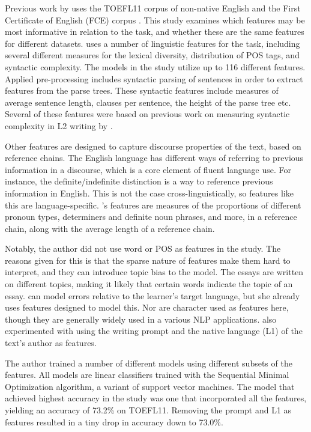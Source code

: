 Previous work by \textcite{vajjala17} uses the TOEFL11 corpus of non-native
English \autocite{blanchard13} and the First Certificate of English (FCE)
corpus \autocite{yannakoudakis2011new}. This study examines which features
may be most informative in relation to the task, and whether these are the
same features for different datasets. \citeauthor{vajjala17} uses a number of
linguistic features for the task, including several different measures for
the lexical diversity, distribution of \ac{POS} tags, and syntactic
complexity. The models in the study utilize up to 116 different features.
Applied pre-processing includes syntactic parsing of sentences in order to
extract features from the parse trees. These syntactic features include
measures of average sentence length, clauses per sentence, the height of the
parse tree etc. Several of these features were based on previous work on
measuring syntactic complexity in L2 writing by \textcite{lu2010automatic}.

Other features are designed to capture discourse properties of the text,
based on reference chains. The English language has different ways of
referring to previous information in a discourse, which is a core element of
fluent language use. For instance, the definite/indefinite distinction is a
way to reference previous information in English. This is not the case
cross-linguistically, so features like this are language-specific.
\citeauthor{vajjala17}'s features are measures of the proportions of
different pronoun types, determiners and definite noun phrases, and more, in
a reference chain, along with the average length of a reference chain.

Notably, the author did not use word or \ac{POS} \ngrams as features in the
study. The reasons given for this is that the sparse nature of \ngram
features make them hard to interpret, and they can introduce topic bias to
the model. The essays are written on different topics, making it likely that
certain words indicate the topic of an essay. \ngrams can model errors
relative to the learner's target language, but she already uses features
designed to model this. Nor are character \ngrams used as features here,
though they are generally widely used in a various NLP applications.
\citeauthor{vajjala17} also experimented with using the writing prompt and
the native language (L1) of the text's author as features.

The author trained a number of different models using different subsets of
the features. All models are linear classifiers trained with the Sequential
Minimal Optimization algorithm, a variant of support vector machines. The
model that achieved highest accuracy in the study was one that incorporated
all the features, yielding an accuracy of 73.2\% on TOEFL11. Removing the
prompt and L1 as features resulted in a tiny drop in accuracy down to
73.0\%.

